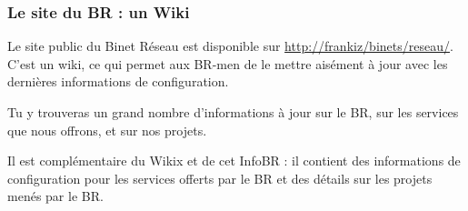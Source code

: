 
\subsubsection{Le site du BR : un Wiki}
\label{siteBR}

Le site public du Binet Réseau est disponible sur \url{http://frankiz/binets/reseau/}. C'est un wiki, ce qui permet aux BR-men de le mettre aisément
à jour avec les dernières informations de configuration.

Tu y trouveras un grand nombre d'informations à jour sur le BR, sur les services que nous offrons, et sur nos projets.

Il est complémentaire du Wikix et de cet InfoBR : il contient des informations de configuration pour les services offerts par le
BR et des détails sur les projets menés par le BR.
